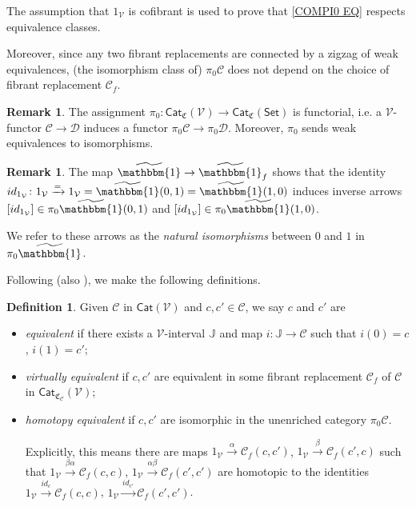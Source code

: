 \documentclass[a4paper,10pt
,draft
]{article}%
\numberwithin{equation}{section}
\numberwithin{figure}{section}
\theoremstyle{definition} %
\newtheorem{definition}[equation]{Definition}%
\newtheorem{remark}[equation]{Remark}%
\newcommand{\Cat}{\mathsf{Cat}}
\newcommand{\V}{\ensuremath{\mathcal V}}
\newcommand{\1}{\ensuremath{\mathbbm 1}}%
\begin{document}
The assumption that $1_{\mathcal{V}}$ is cofibrant
is used to prove that \eqref{COMPI0 EQ}
respects equivalence classes. 

Moreover, since any two fibrant replacements are connected by a zigzag of weak equivalences,
(the isomorphism class of) $\pi_0 \mathcal{C}$ does not depend on the choice of fibrant replacement $\mathcal{C}_f$.



\begin{remark}
      The assignment
      $\pi_0\colon \mathsf{Cat}_{\mathfrak{C}}(\V)
\to \mathsf{Cat}_{\mathfrak{C}}(\mathsf{Set})$ is functorial,
i.e. a $\V$-functor
$\mathcal{C} \to \mathcal{D}$
induces a functor 
$\pi_0\mathcal{C} \to \pi_0\mathcal{D}$.
Moreover, $\pi_0$ sends weak equivalences to isomorphisms.
\end{remark}



\begin{remark}\label{NATISO REM}
The map $\widetilde{\mathbbm{1}} \to \widetilde{\mathbbm{1}}_f$
shows that the identity
$id_{1_{\V}}\colon 1_{\V} \xrightarrow{=} 1_{\V} = \widetilde{\mathbbm{1}}(0,1) = \widetilde{\mathbbm{1}}(1,0)$
induces inverse arrows
$[id_{1_{\V}}] \in \pi_0 \widetilde{\mathbbm{1}}(0,1)$
and
$[id_{1_{\V}}] \in \pi_0 \widetilde{\mathbbm{1}}(1,0)$.

We refer to these arrows as the
\emph{natural isomorphisms} between $0$ and $1$ in $\pi_0 \widetilde{\mathbbm{1}}$.
\end{remark}




Following \cite[Def. 2.6]{BM13} (also \cite{Cav}),
we make the following definitions.

\begin{definition}\label{EQUIV_DEF}
	Given $\mathcal{C}$ in  $\Cat(\V)$ and $c,c'\in \mathcal C$, we say $c$ and $c'$ are
\begin{itemize}
	\item {\em equivalent} if there exists a $\V$-interval $\mathbb{J}$
	and map $i: \mathbb{J} \to \mathcal C$ such that
	$i(0)= c$, $i(1)= c'$;
	\item {\em virtually equivalent} if $c,c'$ are equivalent in some fibrant replacement
	$\mathcal C_f$ of $\mathcal C$ in $\Cat_{\mathfrak{C}_{\mathcal{C}}}(\V)$;
	\item {\em homotopy equivalent} if $c,c'$ are isomorphic in the unenriched category $\pi_0 \mathcal C$.

	Explicitly, this means there are maps 
	$1_\V \xrightarrow{\alpha} \mathcal C_f(c,c')$, 
	$1_\V \xrightarrow{\beta} \mathcal C_f(c',c)$ such that
	$1_{\V} \xrightarrow{\beta \alpha} \mathcal C_f(c,c)$,
	$1_{\V} \xrightarrow{\alpha \beta} \mathcal C_f(c',c')$
	are homotopic to the identities
	$1_{\V} \xrightarrow{id_c} \mathcal C_f(c,c)$,
	$1_{\V} \xrightarrow{id_{c'}} \mathcal C_f(c',c')$.
\end{itemize}
\end{definition}
\end{document}
